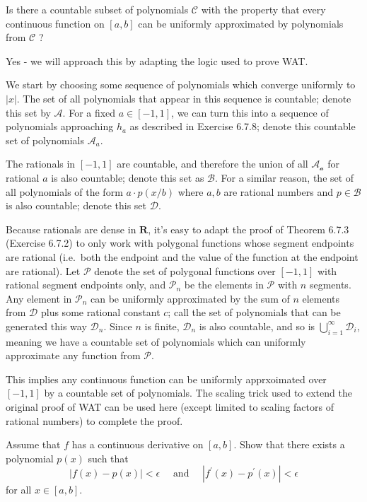 \begin{exercise}
    Is there a countable subset of polynomials $\mathcal{C}$ with the property that every continuous function on $[a, b]$ can be uniformly approximated by polynomials from $\mathcal{C}$ ?
\end{exercise}
\begin{solution}
Yes - we will approach this by adapting the logic used to prove WAT.

We start by choosing some sequence of polynomials which converge uniformly to \(|x|\). The set of all polynomials that appear in this sequence is countable; denote this set by \(\mathcal{A}\). For a fixed \(a \in [-1,1]\), we can turn this into a sequence of polynomials approaching \(h_a\) as described in Exercise 6.7.8; denote this countable set of polynomials \(\mathcal{A}_a\).

The rationals in \([-1,1]\) are countable, and therefore the union of all \(\mathcal{A_a}\) for rational \(a\) is also countable; denote this set as \(\mathcal{B}\). For a similar reason, the set of all polynomials of the form \(a \cdot p(x / b)\) where \(a,b\) are rational numbers and \(p \in \mathcal{B}\) is also countable; denote this set \(\mathcal{D}\).

Because rationals are dense in \(\mathbf{R}\), it's easy to adapt the proof of Theorem 6.7.3 (Exercise 6.7.2) to only work with polygonal functions whose segment endpoints are rational (i.e.\ both the endpoint and the value of the function at the endpoint are rational). Let \(\mathcal{P}\) denote the set of polygonal functions over \([-1,1]\) with rational segment endpoints only, and \(\mathcal{P}_n\) be the elements in \(\mathcal{P}\) with \(n\) segments. Any element in \(\mathcal{P}_n\) can be uniformly approximated by the sum of \(n\) elements from \(\mathcal{D}\) plus some rational constant \(c\); call the set of polynomials that can be generated this way \(\mathcal{D}_n\). Since \(n\) is finite, \(\mathcal{D}_n\) is also countable, and so is \(\bigcup^\infty_{i=1} \mathcal{D}_i\), meaning we have a countable set of polynomials which can uniformly approximate any function from \(\mathcal{P}\).

This implies any continuous function can be uniformly apprxoimated over \([-1,1]\) by a countable set of polynomials. The scaling trick used to extend the original proof of WAT can be used here (except limited to scaling factors of rational numbers) to complete the proof.
\end{solution}

\begin{exercise}
    Assume that $f$ has a continuous derivative on $[a, b]$. Show that there exists a polynomial $p(x)$ such that
$$
|f(x)-p(x)|<\epsilon \quad \text { and } \quad\left|f^{\prime}(x)-p^{\prime}(x)\right|<\epsilon
$$
for all $x \in[a, b]$.
\end{exercise}
